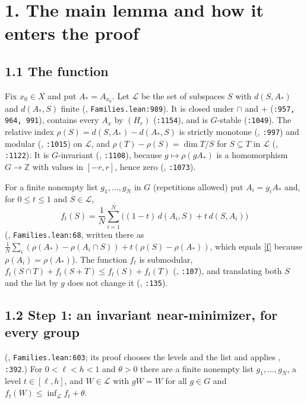 \documentclass[11pt]{amsart}
\newcommand{\Lc}{\mathcal{L}}
\begin{document}
\section*{1. The main lemma and how it enters the proof}

\subsection*{1.1 The function} Fix $x_0\in X$ and put $A_*=A_{x_0}$. Let $\Lc$ be the set of subspaces $S$ with
$d(S,A_*)$ and $d(A_*,S)$ finite (, \texttt{Families.lean:989}). It is closed under $\cap$ and $+$
(\texttt{:957, 964, 991}), contains every $A_x$ by $(H_r)$ (\texttt{:1154}), and is $G$-stable (\texttt{:1049}). The
relative index $\rho(S)=d(S,A_*)-d(A_*,S)$ is strictly monotone (, \texttt{:997}) and modular
(, \texttt{:1015}) on $\Lc$, and $\rho(T)-\rho(S)=\dim T/S$ for $S\subseteq T$ in $\Lc$
(, \texttt{:1122}). It is $G$-invariant (, \texttt{:1108}), because
$g\mapsto\rho(gA_*)$ is a homomorphism $G\to\mathbb Z$ with values in $[-r,r]$, hence zero (,
\texttt{:1073}).

For a finite nonempty list $g_1,\dots,g_N$ in $G$ (repetitions allowed) put $A_i=g_iA_*$ and, for $0\le t\le1$ and
$S\in\Lc$,
\begin{equation}\label{f}
f_t(S)=\frac1N\sum_{i=1}^N\bigl((1-t)\,d(A_i,S)+t\,d(S,A_i)\bigr)\tag{1.1}
\end{equation}
(, \texttt{Families.lean:68}, written there as
$\frac1N\sum_i(\rho(A_*)-\rho(A_i\cap S))+t(\rho(S)-\rho(A_*))$, which equals \eqref{f} because $\rho(A_i)=\rho(A_*)$).
The function $f_t$ is submodular, $f_t(S\cap T)+f_t(S+T)\le f_t(S)+f_t(T)$ (, \texttt{:107}), and translating
both $S$ and the list by $g$ does not change it (, \texttt{:135}).

\subsection*{1.2 Step 1: an invariant near-minimizer, for every group}
(, \texttt{Families.lean:603}; its proof chooses the levels and the list and
applies , \texttt{:392}.) For $0<\ell<h<1$ and $\theta>0$ there are a finite nonempty list
$g_1,\dots,g_N$, a level $t\in[\ell,h]$, and $W\in\Lc$ with $gW=W$ for all $g\in G$ and $f_t(W)\le\inf_\Lc f_t+\theta$.
\end{document}
